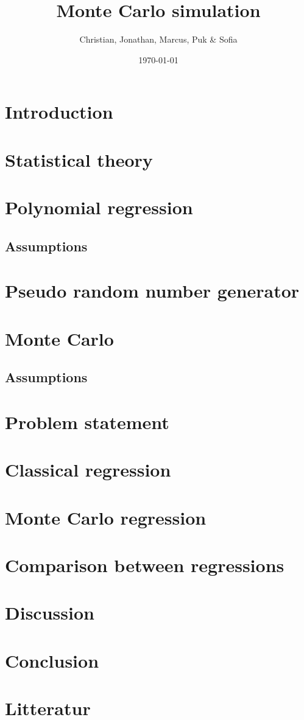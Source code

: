 \documentclass{article}
\title{Monte Carlo simulation}
\author{Christian, Jonathan, Marcus, Puk \& Sofia }
\date{\today}
\begin{document}
	\setcounter{section}{0}
	\maketitle
	\newpage
	\tableofcontents
	\newpage
	\section{Introduction}
	
	\newpage
	\section{Statistical theory}
	



	\newpage
	\section{Polynomial regression}
	\subsection{Assumptions}
	\newpage
	\section{Pseudo random number generator}
	\newpage
	\section{Monte Carlo}
	\subsection{Assumptions}
	\newpage
	\section{Problem statement}
	\newpage
	\section{Classical regression}
	\newpage
	\section{Monte Carlo regression}
	\newpage
	\section{Comparison between regressions}
	\newpage
	\section{Discussion}
	\newpage
	\section{Conclusion}
	\newpage
 	\section{Litteratur}
  
\end{document}
